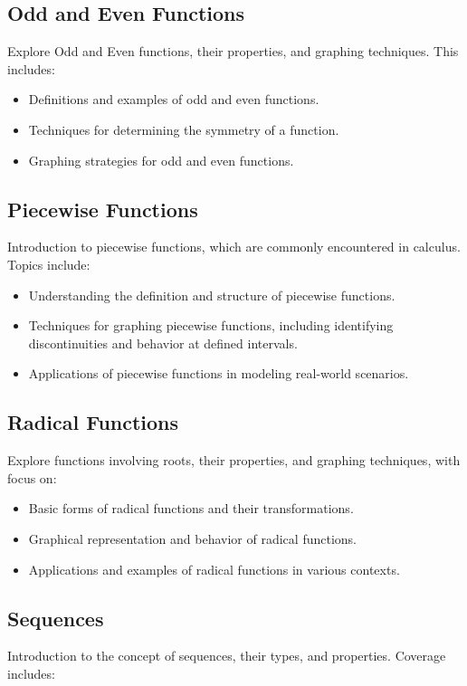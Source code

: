 \documentclass[a4paper,12pt]{book}
\newcounter{example}
\begin{document}
\subsection{Odd and Even Functions}
\label{subsec:odd_even_functions}
Explore Odd and Even functions, their properties, and graphing techniques. This includes:


\begin{itemize}
    \item Definitions and examples of odd and even functions.
    \item Techniques for determining the symmetry of a function.
    \item Graphing strategies for odd and even functions.
\end{itemize}


\subsection{Piecewise Functions}
\label{subsec:piecewise_functions}
Introduction to piecewise functions, which are commonly encountered in calculus. Topics include:


\begin{itemize}
    \item Understanding the definition and structure of piecewise functions.
    \item Techniques for graphing piecewise functions, including identifying discontinuities and behavior at defined intervals.
    \item Applications of piecewise functions in modeling real-world scenarios.
\end{itemize}


\subsection{Radical Functions}
\label{subsec:radical_functions}
Explore functions involving roots, their properties, and graphing techniques, with focus on:


\begin{itemize}
    \item Basic forms of radical functions and their transformations.
    \item Graphical representation and behavior of radical functions.
    \item Applications and examples of radical functions in various contexts.
\end{itemize}


\subsection{Sequences}
\label{subsec:sequences}
Introduction to the concept of sequences, their types, and properties. Coverage includes:
\end{document}
